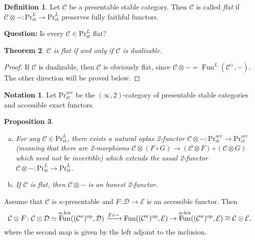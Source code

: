 \documentclass[draft]{amsart}
\newcommand{\cat}[1]{\mathcal{#1}}
\newcommand{\op}{\mathrm{op}}
\renewcommand{\Pr}{\mathrm{Pr}}
\newcommand{\blank}{-} %
\DeclareMathOperator{\Fun}{Fun}
\newtheorem{thm}{Theorem}[section]
\newtheorem{prop}[thm]{Proposition}
\theoremstyle{definition}
\newtheorem{defn}[thm]{Definition}
\newtheorem*{notation}{Notation}
\begin{document}
\begin{defn}
Let $\cat C$ be a presentable stable category. Then $\cat C$ is called \emph{flat} if $\cat C\otimes \blank \colon \Pr^L_{\mathrm{st}} \to \Pr^L_{\mathrm{st}}$ preserves fully faithful functors.
\end{defn}

\textbf{Question:} Is every $\cat C\in \Pr^L_{\mathrm{st}}$ flat?

\begin{thm}\label{Efimov:flat}
$\cat C$ is flat if and only if $\cat C$ is dualizable.
\end{thm}
\begin{proof}
If $\cat C$ is dualizable, then $\cat C$ is obviously flat, since $\cat C\otimes \blank = \Fun^L(\cat C^\vee, \blank)$. The other direction will be proved below.
\end{proof}

\begin{notation}
Let $\Pr^{\mathrm{acc}}_{\mathrm{st}}$ be the $(\infty,2)$-category of presentable stable categories and accessible exact functors.
\end{notation}

\begin{prop}
\begin{enumerate}[(a)]
\item For any $\cat C \in \Pr^L_{\mathrm{st}}$, there exists a natural oplax 2-functor $\cat C\otimes \blank \colon \Pr^{\mathrm{acc}}_{\mathrm{st}} \to \Pr^{\mathrm{acc}}_{\mathrm{st}}$ (meaning that there are 2-morphisms $\cat C\otimes (F\circ G) \to (\cat C\otimes F)\circ (\cat C\otimes G)$ which need not be invertible) which extends the usual 2-functor $\cat C\otimes \blank \colon \Pr^L_{\mathrm{st}} \to \Pr^L_{\mathrm{st}}$.

\item If $\cat C$ is flat, then $\cat C\otimes \blank$ is an honest 2-functor.
\end{enumerate}
\end{prop}

Assume that $\cat C$ is $\kappa$-presentable and $F\colon \cat D\to \cat E$ is an accessible functor. Then
\[
\cat C\otimes F\colon \cat C\otimes \cat D \simeq \Fun^{\textnormal{$\kappa$-lex}}((\cat C^\kappa)^\op, \cat D) \xrightarrow{F\circ \blank} \Fun((\cat C^\kappa)^\op, \cat E) \to \Fun^{\textnormal{$\kappa$-lex}}((\cat C^\kappa)^\op, \cat E) \cong \cat C\otimes \cat E,
\]
where the second map is given by the left adjoint to the inclusion.
\bigskip
\end{document}
